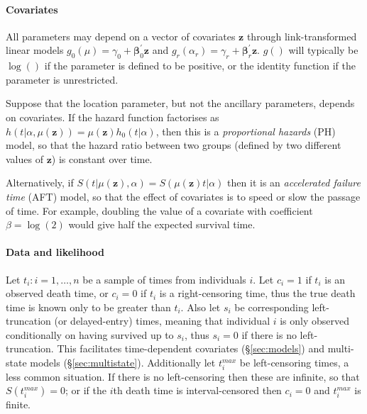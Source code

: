 \documentclass[nojss,nofooter]{jss}
\begin{document}

\paragraph{Covariates} 

All parameters may depend on a vector of covariates $\mathbf{z}$
through link-transformed linear models $g_0(\mu) = \gamma_0 + \bm{\beta}_0^{'}
\mathbf{z}$ and $g_r(\alpha_r) = \gamma_r + \bm{\beta}_r^{'} \mathbf{z}$. $g()$
will typically be $\log()$ if the parameter is defined to be positive,
or the identity function if the parameter is unrestricted.  

Suppose that the location parameter, but not the ancillary parameters, depends
on covariates.  If the hazard function factorises as $h(t | \alpha,
\mu(\mathbf{z})) = \mu(\mathbf{z}) h_0(t | \alpha)$, then this is a
\emph{proportional hazards} (PH) model, so that the hazard ratio between
two groups (defined by two different values of $\mathbf{z}$) is constant
over time.

Alternatively, if $S(t | \mu(\mathbf{z}), \alpha) =
S(\mu(\mathbf{z}) t | \alpha)$ then it is an \emph{accelerated
  failure time} (AFT) model, so that the effect of covariates is to speed or
slow the passage of time. For example, doubling the value of a
covariate with coefficient $\beta=\log(2)$ would give half the
expected survival time.


\paragraph{Data and likelihood} 

Let $t_i: i=1,\ldots, n$ be a sample of times from individuals $i$.
Let $c_i=1$ if $t_i$ is an observed death time, or $c_i=0$ if $t_i$ is
a right-censoring time, thus the true death time is known only to be
greater than $t_i$.  Also let $s_i$ be corresponding left-truncation
(or delayed-entry) times, meaning that individual $i$ is only observed
conditionally on having survived up to $s_i$, thus $s_i=0$ if there is
no left-truncation.  This facilitates time-dependent covariates
(\S\ref{sec:models}) and multi-state models (\S\ref{sec:multistate}).
Additionally let $t^{max}_i$ be left-censoring times, a less common situation.  If there is no
left-censoring then these are infinite, so that $S(t^{max}_i)=0$; or
if the $i$th death time is interval-censored then $c_i=0$ and
$t^{max}_i$ is finite.
\end{document}
